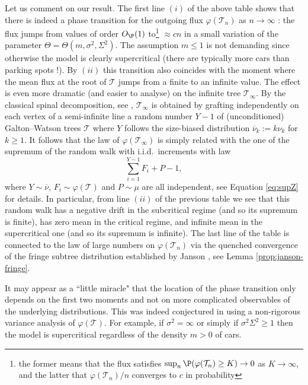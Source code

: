  
 Let us comment on our result. The first  line $(i)$ of the above table shows that there is indeed a phase transition for the outgoing flux $\varphi( \mathcal{T}_{n})$ as $n \to \infty$ :  the flux jumps from values of order $O_\P(1)$ to\footnote{the former means that the flux satisfies $\sup_{n} \P(\varphi( \mathcal{T}_{n}) \geq K ) \to 0$  as $K \to \infty$, and the latter that $\varphi(\mathcal{T}_n)/n$ converges to  $c$ in probability} $\approx cn$ in a small variation of the parameter $\Theta=\Theta(m, \sigma^2, \Sigma^2)$. The assumption $m \leq 1$ is not demanding since otherwise the model is clearly supercritical (there are typically more cars than parking spots !).  By $(ii)$ this transition also coincides with the moment where the mean flux at the root of $ \mathcal{T}$ jumps from a finite to an infinite value. The effect is even more dramatic (and easier to analyse) on the infinite tree $ \mathcal{T}_{\infty}$. By the classical spinal decomposition, see \cite[Chapter 12.1]{LP16}, $ \mathcal{T}_{\infty}$ is obtained by grafting independently on each vertex of a semi-infinite line a random number $Y-1$ of (unconditioned) Galton--Watson trees $ \mathcal{T}$   where $Y$ follows the size-biased distribution $\overline{\nu}_k := k \nu_k$ for $k \geq 1$. It follows that the law of $\varphi( \mathcal{T}_{\infty})$ is simply related with the one of the supremum of the random walk with i.i.d.~increments with law 
 $$ \sum_{i=1}^{Y-1} F_{i} + P-1,$$
where $ Y \sim \overline{\nu}$, $F_{i} \sim \varphi( \mathcal{T})$ and $P \sim \mu$ are all independent, see Equation \eqref{eq:supZ} for details. In particular, from line $(ii)$ of the previous table we see that this random walk has a negative drift in the subcritical regime (and so its supremum is finite), has zero mean in the critical regime, and infinite mean in the supercritical one (and so its supremum is infinite). The last line of the table is connected to the law of large numbers on $ \varphi ( \mathcal{T}_{n})$ via the quenched  convergence of the fringe subtree distribution established by Janson \cite{JA16}, see Lemma \ref{prop:janson-fringe}.

\begin{remark} It may appear as a ``little  miracle" that the location of the phase transition only depends on the first two moments and not on more complicated observables of the underlying distributions. This was indeed conjectured in \cite{GP19} using a non-rigorous variance analysis of $\varphi( \mathcal{T})$. For example, if $\sigma^2=\infty$ or simply if $\sigma^2\Sigma^2\geq 1$ then the model is supercritical regardless of the density $m>0$ of cars.
\end{remark}

